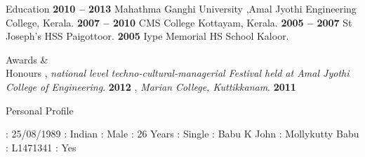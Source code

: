 \documentclass{resume}
\begin{document}
\begin{category}{Education}
   \hfill \textbf{2010 -- 2013}
  \citemnobullet Mahathma Ganghi University ,Amal Jyothi Engineering College, Kerala.
   \hfill \textbf{2007 -- 2010}
  \citemnobullet CMS College Kottayam, Kerala.
   \hfill \textbf{2005 -- 2007}
  \citemnobullet St Joseph's HSS Paigottoor.
    \hfill \textbf{2005}
  \citemnobullet Iype Memorial HS School Kaloor.
\end{category}



\begin{category}{Awards \&\\ Honours}
  , {\em national level techno-cultural-managerial Festival held at Amal Jyothi College of Engineering}. \hfill \textbf{2012}
  , {\em Marian College, Kuttikkanam}. \hfill \textbf{2011}
  
\end{category}

\begin{category}{Personal Profile}
 
           :   25/08/1989 
             :   Indian 
                  :   Male 
                     :   26 Years 
          :   Single 
           :   Babu K John 
           :   Mollykutty Babu 
         :   L1471341
     :   Yes
\end{category}


\end{document}
